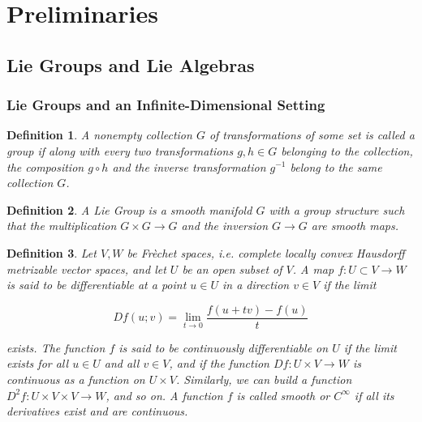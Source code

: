 \documentclass{article}
\newtheorem{defn}{Definition}
\begin{document}
   




\section{Preliminaries}
\subsection{Lie Groups and Lie Algebras}
\subsubsection{Lie Groups and an Infinite-Dimensional Setting}


\begin{defn}

	A nonempty collection $G$ of transformations of some set is called a \textit{group} if along with every two transformations $g,h \in G$ belonging to the collection, the composition $g \circ h$ and the inverse transformation $g^{-1}$ belong to the same collection $G$.

\end{defn}


\begin{defn}

A \textit{Lie Group} is a smooth manifold $G$ with a group structure such that the multiplication $G \times G \to G$ and the inversion $G \to G$ are smooth maps.

\end{defn}


\begin{defn}

Let $V,W$ be \textit{Fr\`echet spaces}, i.e. complete locally convex Hausdorff metrizable vector spaces, and let $U$ be an open subset of $V$. A map $f: U \subset V \to W$ is said to be \textit{differentiable} at a point $u \in U$ in a direction $v \in V$ if the limit


\begin{equation}
Df(u;v) = \lim_{t \to 0} \frac{f(u+tv)-f(u)}{t}
\end{equation}

exists. The function $f$ is said to be continuously differentiable on $U$ if the limit exists for all $u \in U$ and all $v \in V$, and if the function $Df:U \times V \to W$ is continuous as a function on $U \times V$. Similarly, we can build a function $D^2 f: U \times V \times V \to W$, and so on. A function $f$ is called \textit{smooth} or $C^{\infty}$ if all its derivatives exist and are continuous.
\end{defn}
\end{document}
